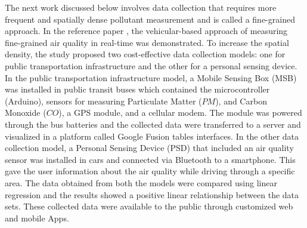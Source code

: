 The next work discussed below involves data collection that requires more frequent and spatially dense pollutant measurement and is called a fine-grained approach. In the reference paper \cite{Devarakonda2013}, the vehicular-based approach of measuring
fine-grained air quality in real-time was demonstrated. To increase the spatial density, the study proposed two cost-effective data collection models: one for public transportation infrastructure and the other for a personal sensing device. In the public transportation infrastructure model, a Mobile Sensing Box (MSB) was installed in public transit buses which contained the microcontroller (Arduino), sensors for measuring Particulate Matter ($PM$), and Carbon Monoxide ($CO$), a GPS module, and a cellular modem. The module was powered through the bus batteries and the collected data were transferred to a server and visualized in a platform called Google Fusion tables interfaces. In the other data collection model, a Personal Sensing Device (PSD) that included an air quality sensor was installed in cars and connected via Bluetooth to a smartphone. This gave the user information about the air quality while driving through a specific area.
The data obtained from both the models were compared using linear regression and the results showed a positive linear relationship between the data sets. These collected data were available to the public through customized web and mobile Apps. %

\par



